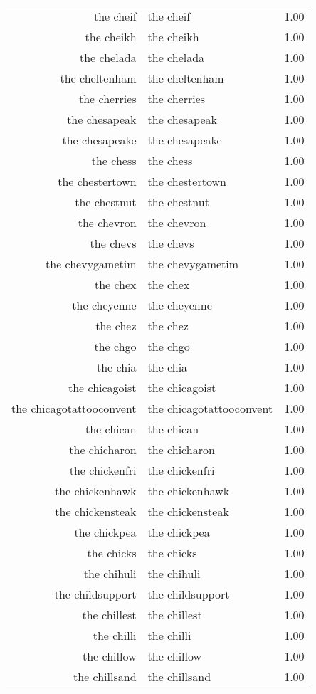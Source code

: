 \begin{table}[ht]
\begin{tabular}{rlr}
  the cheif & the cheif & 1.00 \\ 
  the cheikh & the cheikh & 1.00 \\ 
  the chelada & the chelada & 1.00 \\ 
  the cheltenham & the cheltenham & 1.00 \\ 
  the cherries & the cherries & 1.00 \\ 
  the chesapeak & the chesapeak & 1.00 \\ 
  the chesapeake & the chesapeake & 1.00 \\ 
  the chess & the chess & 1.00 \\ 
  the chestertown & the chestertown & 1.00 \\ 
  the chestnut & the chestnut & 1.00 \\ 
  the chevron & the chevron & 1.00 \\ 
  the chevs & the chevs & 1.00 \\ 
  the chevygametim & the chevygametim & 1.00 \\ 
  the chex & the chex & 1.00 \\ 
  the cheyenne & the cheyenne & 1.00 \\ 
  the chez & the chez & 1.00 \\ 
  the chgo & the chgo & 1.00 \\ 
  the chia & the chia & 1.00 \\ 
  the chicagoist & the chicagoist & 1.00 \\ 
  the chicagotattooconvent & the chicagotattooconvent & 1.00 \\ 
  the chican & the chican & 1.00 \\ 
  the chicharon & the chicharon & 1.00 \\ 
  the chickenfri & the chickenfri & 1.00 \\ 
  the chickenhawk & the chickenhawk & 1.00 \\ 
  the chickensteak & the chickensteak & 1.00 \\ 
  the chickpea & the chickpea & 1.00 \\ 
  the chicks & the chicks & 1.00 \\ 
  the chihuli & the chihuli & 1.00 \\ 
  the childsupport & the childsupport & 1.00 \\ 
  the chillest & the chillest & 1.00 \\ 
  the chilli & the chilli & 1.00 \\ 
  the chillow & the chillow & 1.00 \\ 
  the chillsand & the chillsand & 1.00 \\ 

\end{tabular}
\end{table}

